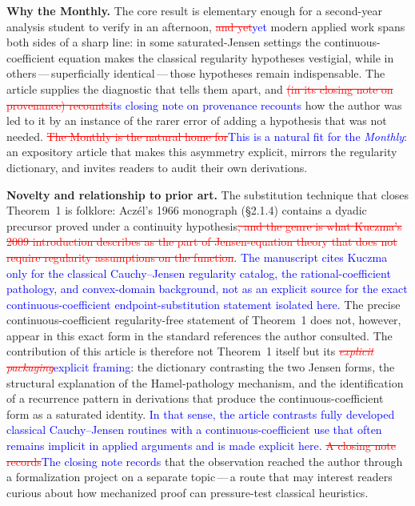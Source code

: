 \documentclass[12pt]{article}
\newcommand{\ReviewAdd}[1]{\textcolor{blue}{#1}}
\newcommand{\ReviewDel}[1]{\textcolor{red}{\sout{#1}}}
\begin{document}
\bigskip
\noindent\textbf{Why the Monthly.}
The core result is elementary enough for a second-year analysis student
to verify in an afternoon, \ReviewDel{and yet}\ReviewAdd{yet} modern applied work spans both
sides of a sharp line: in some saturated-Jensen settings the
continuous-coefficient equation makes the classical regularity
hypotheses vestigial, while in others\,---\,superficially
identical\,---\,those hypotheses remain indispensable. The article
supplies the diagnostic that tells them apart, and \ReviewDel{(in its closing
note on provenance) recounts}\ReviewAdd{its closing note on provenance recounts} how the author was led to it by an
instance of the rarer error of adding a hypothesis that was not
needed. \ReviewDel{The Monthly is the natural home for}\ReviewAdd{This is a natural fit for the \textit{Monthly}:} an expository article that
makes this asymmetry explicit, mirrors the regularity dictionary, and
invites readers to audit their own derivations.

\bigskip
\noindent\textbf{Novelty and relationship to prior art.}
The substitution technique that closes Theorem~1 is folklore:
Acz\'{e}l's 1966 monograph (\S2.1.4) contains a dyadic precursor proved
under a continuity hypothesis\ReviewDel{, and the genre is what Kuczma's 2009
introduction describes as the part of Jensen-equation theory that does
not require regularity assumptions on the function}. \ReviewAdd{The manuscript cites Kuczma only for the classical Cauchy--Jensen regularity catalog, the rational-coefficient pathology, and convex-domain background, not as an explicit source for the exact continuous-coefficient endpoint-substitution statement isolated here.} The precise
continuous-coefficient regularity-free statement of Theorem~1 does
not, however, appear in this exact form in the standard references the
author consulted. The contribution of this article is therefore not
Theorem~1 itself but its \ReviewDel{\emph{explicit packaging}}\ReviewAdd{explicit framing}: the dictionary
contrasting the two Jensen forms, the structural explanation of the
Hamel-pathology mechanism, and the identification of a recurrence
pattern in derivations that produce the continuous-coefficient form as
a saturated identity. \ReviewAdd{In that sense, the article contrasts fully developed classical Cauchy--Jensen routines with a continuous-coefficient use that often remains implicit in applied arguments and is made explicit here.} \ReviewDel{A closing note records}\ReviewAdd{The closing note records} that the observation
reached the author through a formalization project on a separate
topic\,---\,a route that may interest readers curious about how
mechanized proof can pressure-test classical heuristics.
\end{document}
